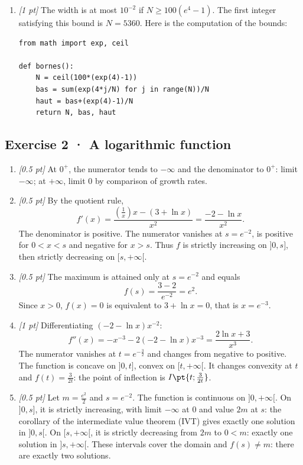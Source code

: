\begin{enumerate}

\item \textit{[1 pt]} The width is at most $10^{-2}$ if $N\ge100(e^{4}-1)$. The first integer satisfying this bound is $N=5360$. Here is the computation of the bounds:
\begin{lstlisting}
from math import exp, ceil

def bornes():
    N = ceil(100*(exp(4)-1))
    bas = sum(exp(4*j/N) for j in range(N))/N
    haut = bas+(exp(4)-1)/N
    return N, bas, haut
\end{lstlisting}


\end{enumerate}

\subsection*{Exercise 2 · A logarithmic function}\begin{enumerate}

\item \textit{[0.5 pt]} At $0^+$, the numerator tends to $-\infty$ and the denominator to $0^+$: limit $-\infty$; at $+\infty$, limit $0$ by comparison of growth rates.

\item \textit{[0.5 pt]} By the quotient rule,
\[f'(x)=\frac{(\frac{1}{x})x-(3+\ln x)}{x^2}=\frac{-2-\ln x}{x^2}.\]
The denominator is positive. The numerator vanishes at $s=e^{-2}$, is positive for $0<x<s$ and negative for $x>s$. Thus $f$ is strictly increasing on $]0,s]$, then strictly decreasing on $[s,+\infty[$.

\item \textit{[0.5 pt]} The maximum is attained only at $s=e^{-2}$ and equals
\[f(s)=\frac{3- 2}{e^{-2}}=e^{2}.\]
Since $x>0$, $f(x)=0$ is equivalent to $3+\ln x=0$, that is $x=e^{-3}$.

\item \textit{[1 pt]} Differentiating $(-2-\ln x)x^{-2}$:
\[f''(x)=-x^{-3}-2(-2-\ln x)x^{-3}=\frac{2\ln x+3}{x^3}.\]
The numerator vanishes at $t=e^{-\frac{3}{2}}$ and changes from negative to positive. The function is concave on $]0,t]$, convex on $[t,+\infty[$. It changes convexity at $t$ and $f(t)=\frac{3}{2t}$: the point of inflection is $I\pt{t;\frac{3}{2t}}$.

\item \textit{[0.5 pt]} Let $m=\frac{e^{2}}{2}$ and $s=e^{-2}$. The function is continuous on $]0,+\infty[$. On $]0,s]$, it is strictly increasing, with limit $-\infty$ at $0$ and value $2m$ at $s$: the corollary of the intermediate value theorem (IVT) gives exactly one solution in $]0,s[$. On $[s,+\infty[$, it is strictly decreasing from $2m$ to $0<m$: exactly one solution in $]s,+\infty[$. These intervals cover the domain and $f(s)\ne m$: there are exactly two solutions.


\end{enumerate}
